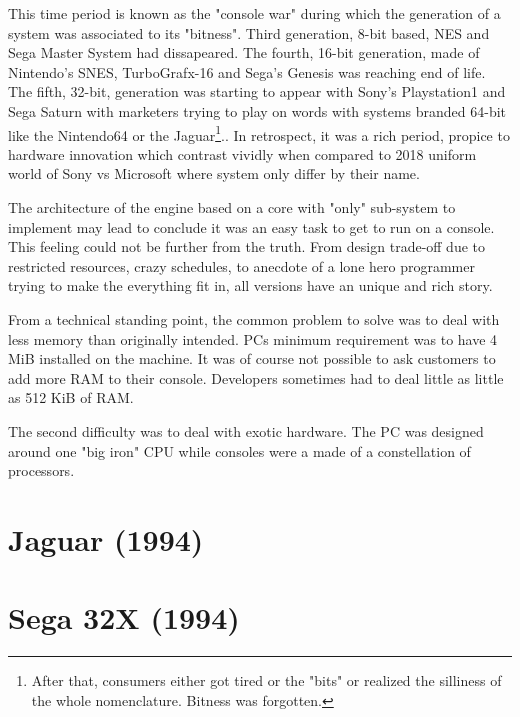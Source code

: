This time period is known as the "console war" during which the generation of a system was associated to its "bitness". Third generation, 8-bit based, NES and Sega Master System had dissapeared. The fourth, 16-bit generation, made of Nintendo's SNES, TurboGrafx-16 and Sega's Genesis was reaching end of life. The fifth, 32-bit, generation 
was starting to appear with Sony's Playstation1 and Sega Saturn with marketers trying to play on words with systems branded 64-bit like the Nintendo64 or the Jaguar\footnote{After that, consumers either got tired or the "bits" or realized the silliness of the whole nomenclature. Bitness was forgotten.}.. In retrospect, it was a rich period, propice to hardware innovation which contrast vividly when compared to 2018 uniform world of Sony vs Microsoft where system only differ by their name.\\
\par
The architecture of the engine based on a core with "only" sub-system to implement may lead to conclude it was an easy task to get \doom to run on a console. This feeling could not be further from the truth. From design trade-off due to restricted resources, crazy schedules, to anecdote of a lone hero programmer trying to make the everything fit in, all versions have an unique and rich story.\\
\par
From a technical standing point, the common problem to solve was to deal with less memory than originally intended. PCs minimum requirement was to have 4 MiB installed on the machine. It was of course not possible to ask customers to add more RAM to their console. Developers sometimes had to deal little as little as 512 KiB of RAM.\\
\par
The second difficulty was to deal with exotic hardware. The PC was designed around one "big iron" CPU while consoles were a made of a constellation of processors.












\section{Jaguar (1994)}
 




\section{Sega 32X (1994)}
 







